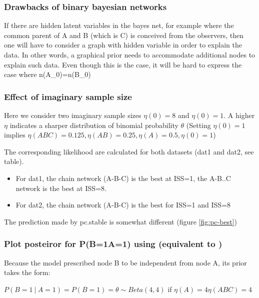 \documentclass[]{article}
\newcommand\gvn[1][]{\:#1\vert\:}
\theoremstyle{definition}
\theoremstyle{definition}
\theoremstyle{definition}
\theoremstyle{remark}
\begin{document}
\subsubsection{Drawbacks of binary bayesian
networks}\label{drawbacks-of-binary-bayesian-networks}

If there are hidden latent variables in the bayes net, for example where
the common parent of A and B (which is C) is conceived from the
observers, then one will have to consider a graph with hidden variable
in order to explain the data. In other words, a graphical prior needs to
accommodate additional nodes to explain such data. Even though this is
the case, it will be hard to express the case where n(A\_0)=n(B\_0)

\subsubsection{Effect of imaginary sample
size}\label{effect-of-imaginary-sample-size}

Here we consider two imaginary sample sizes \(\eta(0)=8\) and
\(\eta(0)=1\). A higher \(\eta\) indicates a sharper distribution of
binomial probability \(\theta\) (Setting \(\eta(0)=1\) implies
\(\eta(ABC)=0.125,\eta(AB)=0.25,\eta(A)=0.5,\eta(0)=1\))

The corresponding likelihood are calculated for both datasets (dat1 and
dat2, see table).

\begin{itemize}
\item
  For dat1, the chain network (A-B-C) is the best at ISS=1, the A-B..C
  network is the best at ISS=8.
\item
  For dat2, the chain network (A-B-C) is the best for ISS=1 and ISS=8
\end{itemize}

The prediction made by pc.stable is somewhat different (figure
\ref{fig:pc-best})

\subsubsection{\texorpdfstring{Plot posteiror for P(B=1\textbar{}A=1)
using \text{[A|C][C][B]} (equivalent to
\text{[C|A][A][B]})}{Plot posteiror for P(B=1\textbar{}A=1) using  (equivalent to )}}\label{plot-posteiror-for-pb1a1-using-equivalent-to}

Because the model prescribed node B to be independent from node A, its
prior takes the form:

\(P(B=1\gvn A=1)=P(B=1)=\theta \sim Beta(4,4)\) if
\(\eta(A)=4\eta(ABC)=4\)
\end{document}
